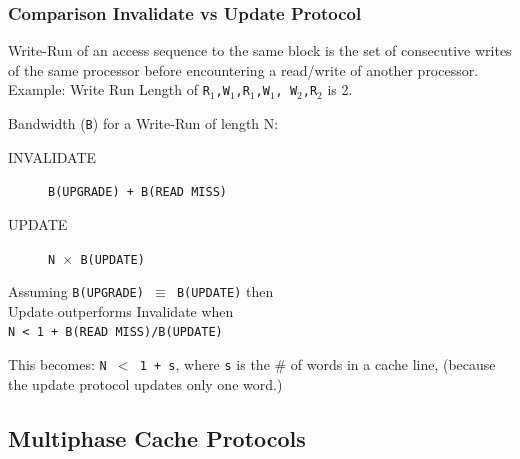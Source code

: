 \documentclass{beamer}
\newcommand{\emp}[1]{\textcolor{DikuRed}{ #1}}
\begin{document}
\begin{frame}[fragile,t]
\frametitle{Comparison Invalidate vs Update Protocol}

\emp{Write-Run} of an access sequence to the same block is
the set of consecutive writes of the same processor before 
encountering a read/write of another processor.\\
\smallskip
Example: Write Run Length of {\tt R$_1$,W$_1$,R$_1$,W$_1$, W$_2$,R$_2$} is 2.
\bigskip

Bandwidth ({\tt B}) for a Write-Run of length N:
\begin{description}
    \item[INVALIDATE] {\tt B(UPGRADE) + B(READ MISS)}
    \item[UPDATE]     {\tt N $\times$ B(UPDATE)}
\end{description}

Assuming {\tt B(UPGRADE) $\equiv$ B(UPDATE)} then\\
\emp{Update outperforms Invalidate when}\\
\emp{{\tt N < 1 + B(READ MISS)/B(UPDATE)}}
\medskip

This becomes: \emp{\tt N $<$ 1 + s}, where {\tt s} is the \# of words in a cache line, 
(because the update protocol updates only one word.)
\end{frame}

\subsection{Multiphase Cache Protocols}
\end{document}
